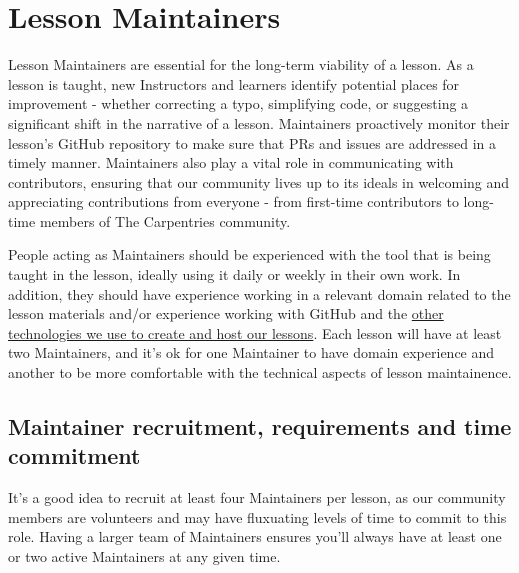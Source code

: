 \documentclass[
]{book}
\begin{document}
\hypertarget{lesson-maintainers}{%
\section{Lesson Maintainers}\label{lesson-maintainers}}

Lesson Maintainers are essential for the long-term viability of a lesson. As a
lesson is taught, new Instructors and learners identify potential places
for improvement - whether correcting a typo, simplifying code, or suggesting
a significant shift in the narrative of a lesson. Maintainers proactively monitor
their lesson's GitHub repository to make sure that PRs and issues are addressed
in a timely manner. Maintainers also play a vital role in communicating with
contributors, ensuring that our community lives up to its ideals in welcoming
and appreciating contributions from everyone - from first-time contributors to long-time
members of The Carpentries community.

People acting as Maintainers should be experienced with the tool that is being
taught in the lesson, ideally using it daily or weekly in their own work. In
addition, they should have experience working in a relevant domain related to the
lesson materials and/or experience working with GitHub and the \protect\hyperlink{technological-introductions}{other technologies
we use to create and host our lessons}. Each
lesson will have at least two Maintainers, and it's ok for one Maintainer
to have domain experience and another to be more comfortable with the technical
aspects of lesson maintainence.

\hypertarget{maintainer-recruitment-requirements-and-time-commitment}{%
\subsection{Maintainer recruitment, requirements and time commitment}\label{maintainer-recruitment-requirements-and-time-commitment}}

It's a good idea to recruit at least four Maintainers per lesson, as our
community members are volunteers and may have fluxuating levels of time to
commit to this role. Having a larger team of Maintainers ensures you'll
always have
at least one or two active Maintainers at any given time.
\end{document}
